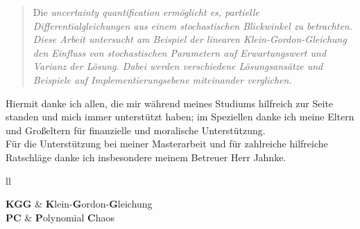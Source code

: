 \documentclass[
11pt, %
ngerman, %
singlespacing, %
headsepline, %
]{MastersDoctoralThesis} %
\begin{document}
\begin{abstract}
\addchaptertocentry{\abstractname} %
 Die \it{uncertainty quantification} ermöglicht es, partielle Differentialgleichungen aus einem stochastischen Blickwinkel zu betrachten. Diese Arbeit untersucht am Beispiel der linearen Klein-Gordon-Gleichung den Einfluss von stochastischen Parametern auf Erwartungswert und Varianz der Lösung. Dabei werden verschiedene Lösungsansätze und Beispiele auf Implementierungsebene miteinander verglichen.
\end{abstract}


\begin{acknowledgements}
\addchaptertocentry{\acknowledgementname} %
Hiermit danke ich allen, die mir während meines Studiums hilfreich zur Seite standen und mich immer unterstützt haben; im Speziellen danke ich meine Eltern und Großeltern für finanzielle und moralische Unterstützung.\\ 
Für die Unterstützung bei meiner Masterarbeit und für zahlreiche hilfreiche Ratschläge danke ich insbesondere meinem Betreuer Herr Jahnke. 
\end{acknowledgements}


\tableofcontents %

\listoffigures %

\listoftables %


\begin{abbreviations}{ll} %

\textbf{KGG} & \textbf{K}lein-\textbf{G}ordon-\textbf{G}leichung\\
\textbf{PC} & \textbf{P}olynomial \textbf{C}haos\\


\end{abbreviations}
\end{document}
